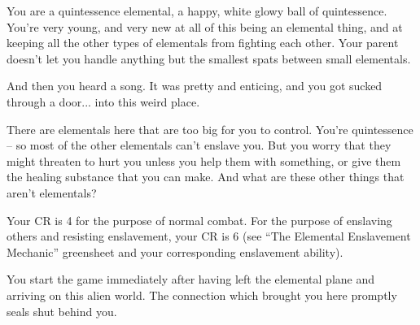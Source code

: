 \documentclass[char]{elementals}
\begin{document}
\name{\cNewQ{}}

You are a quintessence elemental, a happy, white glowy ball of quintessence.  You're very young, and very new at all of this being an elemental thing, and at keeping all the other types of elementals from fighting each other.  Your parent doesn't let you handle anything but the smallest spats between small elementals.

And then you heard a song.  It was pretty and enticing, and you got sucked through a door... into this weird place.

There are elementals here that are too big for you to control.  You're quintessence -- so most of the other elementals can't enslave you.  But you worry that they might threaten to hurt you unless you help them with something, or give them the healing substance \iWhiteQ{} that you can make.  And what are these other things that aren't elementals?

Your CR is 4 for the purpose of normal combat. For the purpose of enslaving others and resisting enslavement, your CR is 6 (see ``The Elemental Enslavement Mechanic'' greensheet and your corresponding enslavement ability).

You start the game immediately after having left the elemental plane and arriving on this alien world. The connection which brought you here promptly seals shut behind you.
\end{document}

